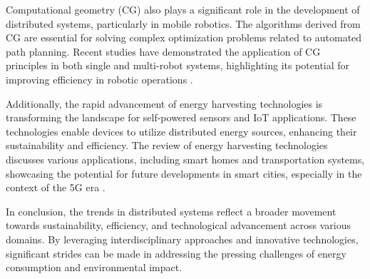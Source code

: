 \documentclass[runningheads]{llncs}
\begin{document}
Computational geometry (CG) also plays a significant role in the development of distributed systems, particularly in mobile robotics. The algorithms derived from CG are essential for solving complex optimization problems related to automated path planning. Recent studies have demonstrated the application of CG principles in both single and multi-robot systems, highlighting its potential for improving efficiency in robotic operations \cite{Ehsan_2023}. 

Additionally, the rapid advancement of energy harvesting technologies is transforming the landscape for self-powered sensors and IoT applications. These technologies enable devices to utilize distributed energy sources, enhancing their sustainability and efficiency. The review of energy harvesting technologies discusses various applications, including smart homes and transportation systems, showcasing the potential for future developments in smart cities, especially in the context of the 5G era \cite{Long_2021}.

In conclusion, the trends in distributed systems reflect a broader movement towards sustainability, efficiency, and technological advancement across various domains. By leveraging interdisciplinary approaches and innovative technologies, significant strides can be made in addressing the pressing challenges of energy consumption and environmental impact.
\end{document}

